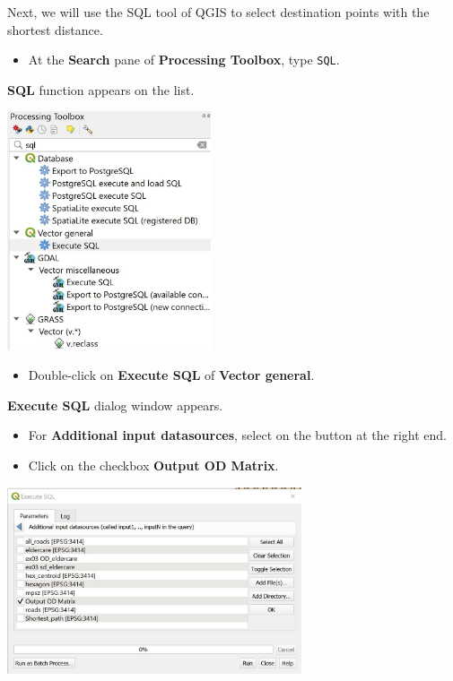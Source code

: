 \documentclass[
  letterpaper,
  DIV=11,
  numbers=noendperiod]{scrreprt}
\providecommand{\tightlist}{%
  \setlength{\itemsep}{0pt}\setlength{\parskip}{0pt}}\usepackage{longtable,booktabs,array}
\begin{document}
Next, we will use the SQL tool of QGIS to select destination points with
the shortest distance.

\begin{itemize}
\tightlist
\item
  At the \textbf{Search} pane of \textbf{Processing Toolbox}, type
  \texttt{SQL}.
\end{itemize}

\textbf{SQL} function appears on the list.

\includegraphics[width=0.45\textwidth,height=\textheight]{./img09/image30.jpg}

\begin{itemize}
\tightlist
\item
  Double-click on \textbf{Execute SQL} of \textbf{Vector general}.
\end{itemize}

\textbf{Execute SQL} dialog window appears.

\begin{itemize}
\item
  For \textbf{Additional input datasources}, select on the button at the
  right end.
\item
  Click on the checkbox \textbf{Output OD Matrix}.
\end{itemize}

\includegraphics[width=0.65\textwidth,height=\textheight]{./img09/image31.jpg}
\end{document}
